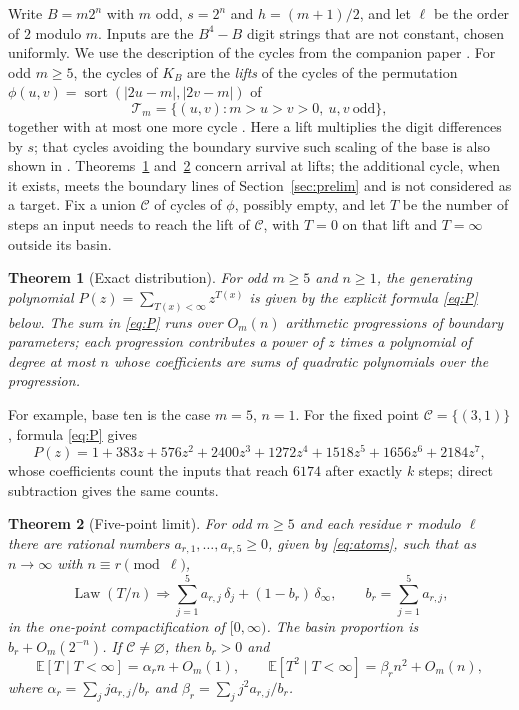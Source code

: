 \documentclass[11pt]{amsart}
\newtheorem{theorem}{Theorem}
\theoremstyle{remark}
\DeclareMathOperator{\sort}{sort}
\newcommand{\T}{\mathcal{T}}
\newcommand{\C}{\mathcal{C}}
\begin{document}
Write $B=m2^n$ with $m$ odd, $s=2^n$ and $h=(m+1)/2$, and let $\ell$ be the order of $2$ modulo $m$. Inputs are the $B^4-B$ digit strings that are not constant, chosen uniformly. We use the description of the cycles from the companion paper \cite{G1}. For odd $m\ge5$, the cycles of $K_B$ are the \emph{lifts} of the cycles of the permutation $\phi(u,v)=\sort(|2u-m|,|2v-m|)$ of
\[
\T_m=\{(u,v):m>u>v>0,\ u,v\ \text{odd}\},
\]
together with at most one more cycle \cite[Theorem~1]{G1}. Here a lift multiplies the digit differences by $s$; that cycles avoiding the boundary survive such scaling of the base is also shown in \cite[Theorem~3.2]{KSL}. Theorems~\ref{thm:exact} and~\ref{thm:limit} concern arrival at lifts; the additional cycle, when it exists, meets the boundary lines of Section~\ref{sec:prelim} and is not considered as a target. Fix a union $\C$ of cycles of $\phi$, possibly empty, and let $T$ be the number of steps an input needs to reach the lift of $\C$, with $T=0$ on that lift and $T=\infty$ outside its basin.

\begin{theorem}[Exact distribution]\label{thm:exact}
For odd $m\ge5$ and $n\ge1$, the generating polynomial $P(z)=\sum_{T(x)<\infty}z^{T(x)}$ is given by the explicit formula \eqref{eq:P} below. The sum in \eqref{eq:P} runs over $O_m(n)$ arithmetic progressions of boundary parameters; each progression contributes a power of $z$ times a polynomial of degree at most $n$ whose coefficients are sums of quadratic polynomials over the progression.
\end{theorem}

For example, base ten is the case $m=5$, $n=1$. For the fixed point $\C=\{(3,1)\}$, formula \eqref{eq:P} gives
\[
P(z)=1+383z+576z^2+2400z^3+1272z^4+1518z^5+1656z^6+2184z^7,
\]
whose coefficients count the inputs that reach $6174$ after exactly $k$ steps; direct subtraction gives the same counts.

\begin{theorem}[Five-point limit]\label{thm:limit}
For odd $m\ge5$ and each residue $r$ modulo $\ell$ there are rational numbers $a_{r,1},\dots,a_{r,5}\ge0$, given by \eqref{eq:atoms}, such that as $n\to\infty$ with $n\equiv r\pmod\ell$,
\[
\operatorname{Law}(T/n)\Longrightarrow\sum_{j=1}^5a_{r,j}\,\delta_j+(1-b_r)\,\delta_\infty,\qquad b_r=\sum_{j=1}^5a_{r,j},
\]
in the one-point compactification of $[0,\infty)$. The basin proportion is $b_r+O_m(2^{-n})$. If $\C\ne\varnothing$, then $b_r>0$ and
\[
\mathbb E[T\mid T<\infty]=\alpha_rn+O_m(1),\qquad
\mathbb E[T^2\mid T<\infty]=\beta_rn^2+O_m(n),
\]
where $\alpha_r=\sum_jja_{r,j}/b_r$ and $\beta_r=\sum_jj^2a_{r,j}/b_r$.
\end{theorem}
\end{document}
